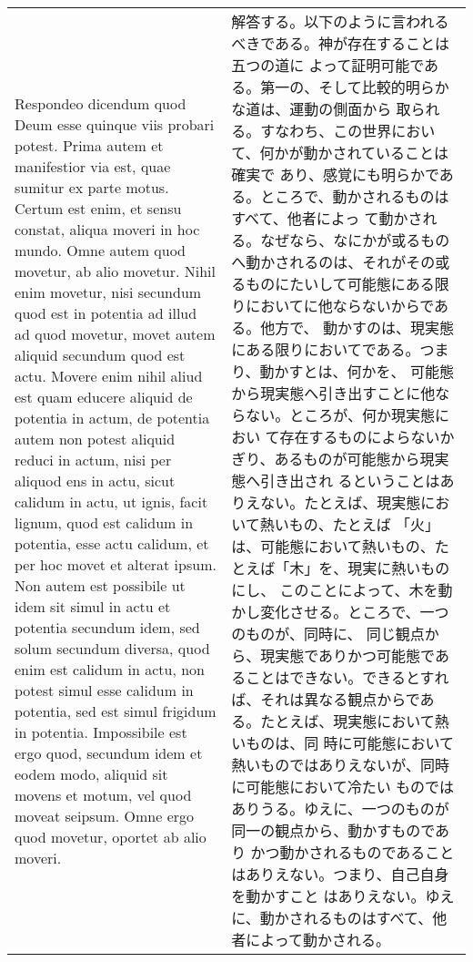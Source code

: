\documentclass[10pt]{jsarticle}
\begin{document}
\begin{longtable}{p{21em}p{21em}}
\\


{\sc Respondeo dicendum} quod Deum esse quinque viis probari
potest. Prima autem et manifestior via est, quae sumitur ex parte
motus. Certum est enim, et sensu constat, aliqua moveri in hoc
mundo. Omne autem quod movetur, ab alio movetur. Nihil enim movetur,
nisi secundum quod est in potentia ad illud ad quod movetur, movet
autem aliquid secundum quod est actu. Movere enim nihil aliud est quam
educere aliquid de potentia in actum, de potentia autem non potest
aliquid reduci in actum, nisi per aliquod ens in actu, sicut calidum
in actu, ut ignis, facit lignum, quod est calidum in potentia, esse
actu calidum, et per hoc movet et alterat ipsum. Non autem est
possibile ut idem sit simul in actu et potentia secundum idem, sed
solum secundum diversa, quod enim est calidum in actu, non potest
simul esse calidum in potentia, sed est simul frigidum in
potentia. Impossibile est ergo quod, secundum idem et eodem modo,
aliquid sit movens et motum, vel quod moveat seipsum. Omne ergo quod
movetur, oportet ab alio moveri.

& 

解答する。以下のように言われるべきである。神が存在することは五つの道に
よって証明可能である。第一の、そして比較的明らかな道は、運動の側面から
取られる。すなわち、この世界において、何かが動かされていることは確実で
あり、感覚にも明らかである。ところで、動かされるものはすべて、他者によっ
て動かされる。なぜなら、なにかが或るものへ動かされるのは、それがその或
るものにたいして可能態にある限りにおいてに他ならないからである。他方で、
動かすのは、現実態にある限りにおいてである。つまり、動かすとは、何かを、
可能態から現実態へ引き出すことに他ならない。ところが、何か現実態におい
て存在するものによらないかぎり、あるものが可能態から現実態へ引き出され
るということはありえない。たとえば、現実態において熱いもの、たとえば
「火」は、可能態において熱いもの、たとえば「木」を、現実に熱いものにし、
このことによって、木を動かし変化させる。ところで、一つのものが、同時に、
同じ観点から、現実態でありかつ可能態であることはできない。できるとすれ
ば、それは異なる観点からである。たとえば、現実態において熱いものは、同
時に可能態において熱いものではありえないが、同時に可能態において冷たい
ものではありうる。ゆえに、一つのものが同一の観点から、動かすものであり
かつ動かされるものであることはありえない。つまり、自己自身を動かすこと
はありえない。ゆえに、動かされるものはすべて、他者によって動かされる。

\\


\end{longtable}
\end{document}

